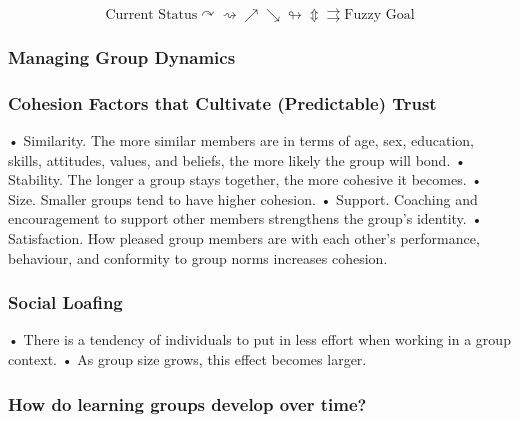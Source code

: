 \documentclass[
]{book}
\begin{document}
\[\text{Current Status} \curvearrowright \rightsquigarrow\nearrow\searrow\looparrowright\Updownarrow\rightrightarrows\text{Fuzzy Goal}\]

\hypertarget{managing-group-dynamics}{%
\subsubsection*{Managing Group Dynamics}\label{managing-group-dynamics}}

\hypertarget{cohesion-factors-that-cultivate-predictable-trust}{%
\subsubsection*{Cohesion Factors that Cultivate (Predictable) Trust}\label{cohesion-factors-that-cultivate-predictable-trust}}

• Similarity. The more similar members are in terms of age, sex, education, skills, attitudes, values, and beliefs, the more likely the group will bond.
• Stability. The longer a group stays together, the more cohesive it becomes.
• Size. Smaller groups tend to have higher cohesion.
• Support. Coaching and encouragement to support other members strengthens the group's identity.
• Satisfaction. How pleased group members are with each other's performance, behaviour, and conformity to group norms increases cohesion.

\hypertarget{social-loafing}{%
\subsubsection*{Social Loafing}\label{social-loafing}}

• There is a tendency of individuals to put in less effort when working in a group context.
• As group size grows, this effect becomes larger.

\hypertarget{how-do-learning-groups-develop-over-time}{%
\subsubsection*{How do learning groups develop over time?}\label{how-do-learning-groups-develop-over-time}}
\end{document}
